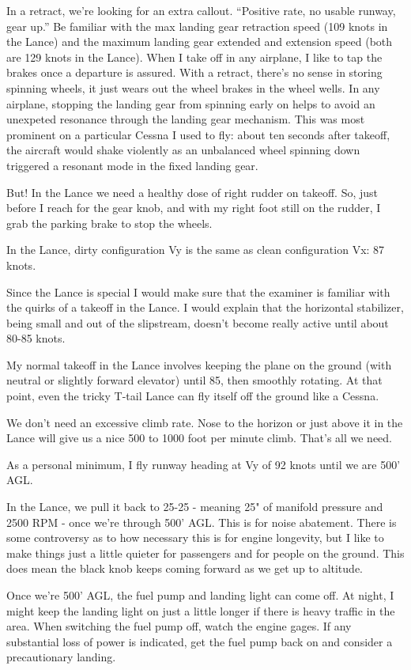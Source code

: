In a retract, we're looking for an extra callout. ``Positive rate, no usable runway, gear up.'' Be familiar with the max landing gear retraction speed (109 knots in the Lance) and the maximum landing gear extended and extension speed (both are 129 knots in the Lance). When I take off in any airplane, I like to tap the brakes once a departure is assured. With a retract, there's no sense in storing spinning wheels, it just wears out the wheel brakes in the wheel wells. In any airplane, stopping the landing gear from spinning early on helps to avoid an unexpeted resonance through the landing gear mechanism. This was most prominent on a particular Cessna I used to fly: about ten seconds after takeoff, the aircraft would shake violently as an unbalanced wheel spinning down triggered a resonant mode in the fixed landing gear.

But! In the Lance we need a healthy dose of right rudder on takeoff. So, just before I reach for the gear knob, and with my right foot still on the rudder, I grab the parking brake to stop the wheels.

In the Lance, dirty configuration Vy is the same as clean configuration Vx: 87 knots.

Since the Lance is special I would make sure that the examiner is familiar with the quirks of a takeoff in the Lance. I would explain that the horizontal stabilizer, being small and out of the slipstream, doesn't become really active until about 80-85 knots.

My normal takeoff in the Lance involves keeping the plane on the ground (with neutral or slightly forward elevator) until 85, then smoothly rotating. At that point, even the tricky T-tail Lance can fly itself off the ground like a Cessna.

We don't need an excessive climb rate. Nose to the horizon or just above it in the Lance will give us a nice 500 to 1000 foot per minute climb. That's all we need.

As a personal minimum, I fly runway heading at Vy of 92 knots until we are 500' AGL.

In the Lance, we pull it back to 25-25 - meaning 25" of manifold pressure and 2500 RPM - once we're through 500' AGL. This is for noise abatement. There is some controversy as to how necessary this is for engine longevity, but I like to make things just a little quieter for passengers and for people on the ground. This does mean the black knob keeps coming forward as we get up to altitude.

Once we're 500' AGL, the fuel pump and landing light can come off. At night, I might keep the landing light on just a little longer if there is heavy traffic in the area. When switching the fuel pump off, watch the engine gages. If any substantial loss of power is indicated, get the fuel pump back on and consider a precautionary landing.

